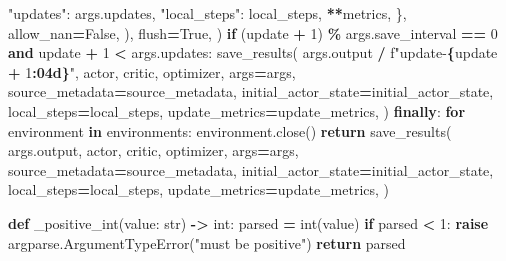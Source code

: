 \documentclass[
  american,
  11pt,
  letterpaper,
]{article}
\newenvironment{Shaded}{\begin{snugshade}}{\end{snugshade}}
\newcommand{\BuiltInTok}[1]{#1}
\newcommand{\ControlFlowTok}[1]{\textcolor[rgb]{0.13,0.29,0.53}{\textbf{#1}}}
\newcommand{\DecValTok}[1]{\textcolor[rgb]{0.00,0.00,0.81}{#1}}
\newcommand{\KeywordTok}[1]{\textcolor[rgb]{0.13,0.29,0.53}{\textbf{#1}}}
\newcommand{\NormalTok}[1]{#1}
\newcommand{\OperatorTok}[1]{\textcolor[rgb]{0.81,0.36,0.00}{\textbf{#1}}}
\newcommand{\SpecialCharTok}[1]{\textcolor[rgb]{0.81,0.36,0.00}{\textbf{#1}}}
\newcommand{\SpecialStringTok}[1]{\textcolor[rgb]{0.31,0.60,0.02}{#1}}
\newcommand{\StringTok}[1]{\textcolor[rgb]{0.31,0.60,0.02}{#1}}
\newcommand{\VariableTok}[1]{\textcolor[rgb]{0.00,0.00,0.00}{#1}}
\renewenvironment{Shaded}{\par\smallskip}{\par\smallskip}
\begin{document}
\begin{Shaded}
\begin{Highlighting}[]
                        \StringTok{"updates"}\NormalTok{: args.updates,}
                        \StringTok{"local\_steps"}\NormalTok{: local\_steps,}
                        \OperatorTok{**}\NormalTok{metrics,}
\NormalTok{                    \},}
\NormalTok{                    allow\_nan}\OperatorTok{=}\VariableTok{False}\NormalTok{,}
\NormalTok{                ),}
\NormalTok{                flush}\OperatorTok{=}\VariableTok{True}\NormalTok{,}
\NormalTok{            )}
            \ControlFlowTok{if}\NormalTok{ (update }\OperatorTok{+} \DecValTok{1}\NormalTok{) }\OperatorTok{\%}\NormalTok{ args.save\_interval }\OperatorTok{==} \DecValTok{0} \KeywordTok{and}\NormalTok{ update }\OperatorTok{+} \DecValTok{1} \OperatorTok{\textless{}}\NormalTok{ args.updates:}
\NormalTok{                save\_results(}
\NormalTok{                    args.output }\OperatorTok{/} \SpecialStringTok{f"update{-}}\SpecialCharTok{\{}\NormalTok{update }\OperatorTok{+} \DecValTok{1}\SpecialCharTok{:04d\}}\SpecialStringTok{"}\NormalTok{, actor, critic, optimizer,}
\NormalTok{                    args}\OperatorTok{=}\NormalTok{args, source\_metadata}\OperatorTok{=}\NormalTok{source\_metadata,}
\NormalTok{                    initial\_actor\_state}\OperatorTok{=}\NormalTok{initial\_actor\_state,}
\NormalTok{                    local\_steps}\OperatorTok{=}\NormalTok{local\_steps, update\_metrics}\OperatorTok{=}\NormalTok{update\_metrics,}
\NormalTok{                )}
    \ControlFlowTok{finally}\NormalTok{:}
        \ControlFlowTok{for}\NormalTok{ environment }\KeywordTok{in}\NormalTok{ environments:}
\NormalTok{            environment.close()}
    \ControlFlowTok{return}\NormalTok{ save\_results(}
\NormalTok{        args.output,}
\NormalTok{        actor,}
\NormalTok{        critic,}
\NormalTok{        optimizer,}
\NormalTok{        args}\OperatorTok{=}\NormalTok{args,}
\NormalTok{        source\_metadata}\OperatorTok{=}\NormalTok{source\_metadata,}
\NormalTok{        initial\_actor\_state}\OperatorTok{=}\NormalTok{initial\_actor\_state,}
\NormalTok{        local\_steps}\OperatorTok{=}\NormalTok{local\_steps,}
\NormalTok{        update\_metrics}\OperatorTok{=}\NormalTok{update\_metrics,}
\NormalTok{    )}


\KeywordTok{def}\NormalTok{ \_positive\_int(value: }\BuiltInTok{str}\NormalTok{) }\OperatorTok{{-}\textgreater{}} \BuiltInTok{int}\NormalTok{:}
\NormalTok{    parsed }\OperatorTok{=} \BuiltInTok{int}\NormalTok{(value)}
    \ControlFlowTok{if}\NormalTok{ parsed }\OperatorTok{\textless{}} \DecValTok{1}\NormalTok{:}
        \ControlFlowTok{raise}\NormalTok{ argparse.ArgumentTypeError(}\StringTok{"must be positive"}\NormalTok{)}
    \ControlFlowTok{return}\NormalTok{ parsed}



\end{Highlighting}
\end{Shaded}
\end{document}
